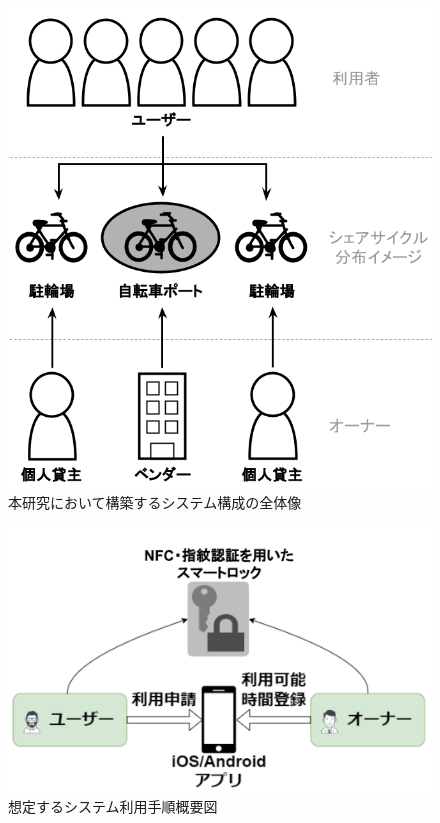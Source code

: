           \begin{figure}[b!]
            \centering
            \includegraphics[scale=0.34]
            {figures/OverallImageOfSystemConfiguration.png}
            \caption{本研究において構築するシステム構成の全体像}
            \label{fig:本研究において構築するシステム構成の全体像}
          \end{figure}
          
          \begin{figure}[b!]
            \centering
            \includegraphics[scale=0.15]
            {figures/howToUse.png}
            \caption{想定するシステム利用手順概要図}
            \label{fig:想定するシステム利用手順概要図}
          \end{figure}
      
